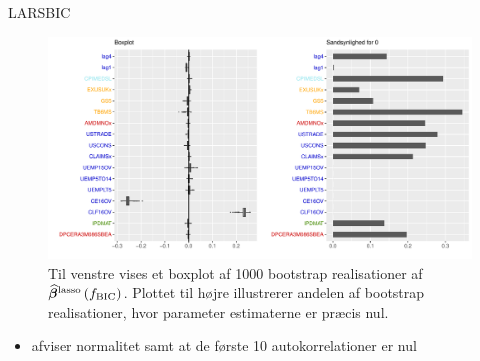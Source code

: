 \begin{frame}{LARS}{BIC}
\begin{figure}
 \includegraphics[width=1\linewidth, height=0.7\textheight]{slides/boxplot_lars_lasso_bic.pdf}
 \caption{Til venstre vises et boxplot af 1000 bootstrap realisationer af $\widehat{\boldsymbol{\beta}}^{\text{lasso}} \del{f_\text{BIC}} $.
Plottet til højre illustrerer andelen af bootstrap realisationer, hvor parameter estimaterne er præcis nul. }
 \end{figure}
 \begin{itemize}
\item afviser normalitet samt at de første 10 autokorrelationer er nul
\end{itemize}
\end{frame}

